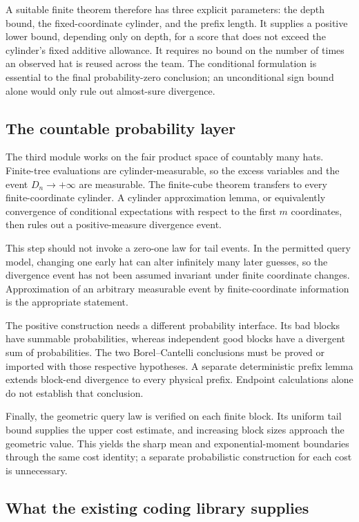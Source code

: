 \documentclass[11pt,letterpaper]{article}
\theoremstyle{definition}
\begin{document}
A suitable finite theorem therefore has three explicit parameters: the
depth bound, the fixed-coordinate cylinder, and the prefix length.  It
supplies a positive lower bound, depending only on depth, for a score that
does not exceed the cylinder's fixed additive allowance.  It requires no
bound on the number of times an observed hat is reused across the team.
The conditional formulation is essential to the final probability-zero
conclusion; an unconditional sign bound alone would only rule out
almost-sure divergence.

\subsection{The countable probability layer}

The third module works on the fair product space of countably many hats.
Finite-tree evaluations are cylinder-measurable, so the excess variables
and the event \(D_n\to+\infty\) are measurable.  The finite-cube theorem
transfers to every finite-coordinate cylinder.  A cylinder approximation
lemma, or equivalently convergence of conditional expectations with respect
to the first \(m\) coordinates, then rules out a positive-measure divergence
event.

This step should not invoke a zero-one law for tail events.  In the permitted
query model, changing one early hat can alter infinitely many later guesses,
so the divergence event has not been assumed invariant under finite
coordinate changes.  Approximation of an arbitrary measurable event by
finite-coordinate information is the appropriate statement.

The positive construction needs a different probability interface.
Its bad blocks have summable probabilities, whereas independent good blocks
have a divergent sum of probabilities.  The two Borel--Cantelli conclusions
must be proved or imported with those respective hypotheses.  A separate
deterministic prefix lemma extends block-end divergence to every physical
prefix.  Endpoint calculations alone do not establish that conclusion.

Finally, the geometric query law is verified on each finite block.  Its
uniform tail bound supplies the upper cost estimate, and increasing block
sizes approach the geometric value.  This yields the sharp mean and
exponential-moment boundaries through the same cost identity; a separate
probabilistic construction for each cost is unnecessary.

\subsection{What the existing coding library supplies}
\end{document}

